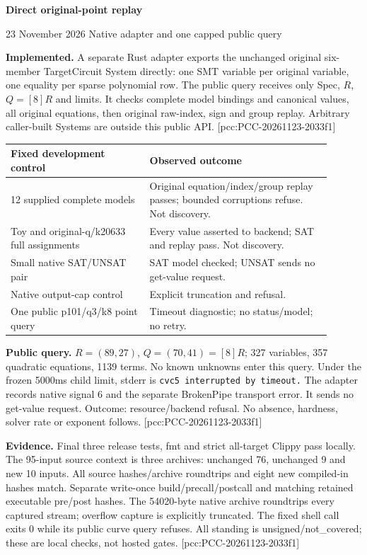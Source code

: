 \documentclass[10pt]{article}
\begin{document}
{\Large\bfseries\color{ink} Direct original-point replay}\par
{\small 23 November 2026 \quad Native adapter and one capped public query}

\textbf{Implemented.} A separate Rust adapter exports the unchanged original
six-member TargetCircuit System directly: one SMT variable per original
variable, one equality per sparse polynomial row. The public query receives
only Spec, $R$, $Q=[8]R$ and limits. It checks complete model bindings and
canonical values, all original equations, then original raw-index, sign and
group replay. Arbitrary caller-built Systems are outside this public API.
[pcc:PCC-20261123-2033f1]

\begin{center}
\begin{tabular}{p{0.39\linewidth}p{0.51\linewidth}}
\toprule Fixed development control & Observed outcome\\\midrule
12 supplied complete models & Original equation/index/group replay passes; bounded corruptions refuse. Not discovery.\\
Toy and original-q/k20633 full assignments & Every value asserted to backend; SAT and replay pass. Not discovery.\\
Small native SAT/UNSAT pair & SAT model checked; UNSAT sends no get-value request.\\
Native output-cap control & Explicit truncation and refusal.\\
One public p101/q3/k8 point query & Timeout diagnostic; no status/model; no retry.\\\bottomrule
\end{tabular}
\end{center}

\textbf{Public query.} $R=(89,27)$, $Q=(70,41)=[8]R$; 327 variables,
357 quadratic equations, 1139 terms. No known unknowns enter this query.
Under the frozen 5000ms child limit, stderr is
\texttt{cvc5 interrupted by timeout.} The adapter records native signal 6 and
the separate BrokenPipe transport error. It sends no get-value request.
Outcome: resource/backend refusal. No absence, hardness, solver rate or
exponent follows. [pcc:PCC-20261123-2033f1]

\textbf{Evidence.} Final three release tests, fmt and strict all-target Clippy
pass locally. The 95-input source context is three archives: unchanged 76,
unchanged 9 and new 10 inputs. All source hashes/archive roundtrips and eight
new compiled-in hashes match. Separate write-once build/precall/postcall and
matching retained executable pre/post hashes. The 54020-byte native archive
roundtrips every captured stream; overflow capture is explicitly truncated.
The fixed shell call exits 0 while its public curve query refuses. All standing
is unsigned/not\_covered; these are local checks, not hosted gates.
[pcc:PCC-20261123-2033f1]
\end{document}
